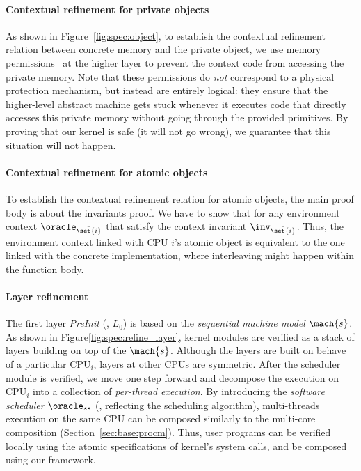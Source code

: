 {\paragraph{Contextual refinement for private objects}
As shown in Figure~\ref{fig:spec:object},
to establish the contextual refinement relation
between concrete memory and the private object,
we use memory permissions~\cite{leroy08} at the higher layer
to prevent the context code
from accessing the private memory.
Note that these permissions do \emph{not}
correspond to a physical protection mechanism,
but instead are entirely logical:
they ensure that the higher-level abstract machine
gets stuck whenever it executes
code that directly accesses this private memory without going through the provided
primitives. By proving that our kernel is safe (it will not go wrong),
we guarantee that this situation will not happen.

\paragraph{Contextual refinement for atomic objects}
To establish the contextual refinement relation
for atomic objects, the main proof body is about the invariants proof.
We have to show that for any environment context $\oracle_{\bar{\set{i}}}$
that satisfy the context invariant $\inv_{\bar{\set{i}}}$.
Thus, the environment context linked with CPU $i$'s atomic object
is equivalent to the one linked with the concrete implementation,
where interleaving might happen within the function body.

\paragraph{Layer refinement}


The first layer \emph{PreInit} (\ie, $L_0$)
is based on the \emph{sequential machine model} $\mach{s}$.
As shown in Figure\ref{fig:spec:refine_layer},
kernel modules
are verified as a stack of layers
building 
on top of the $\mach{s}$.
Although the layers are built
on behave of a particular $\text{CPU}_i$,
layers at other CPUs are symmetric.
After the scheduler module is verified,
we move one step forward
and decompose the execution on $\text{CPU}_i$
into a collection of \emph{per-thread execution}.
By introducing the \emph{software scheduler}
$\oracle_{ss}$ (\ie, reflecting the scheduling algorithm),
multi-threads execution on the same CPU 
can be composed similarly to the multi-core composition
(\cf Section~\ref{sec:base:procm}).
Thus, user programs can be verified
locally using the atomic specifications of kernel's
system calls,
and be composed using our framework.

}


